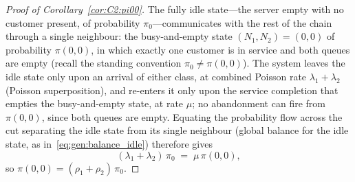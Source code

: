 \begin{proof}[Proof of Corollary~\ref{cor:C2:pi00}]
    The fully idle state---the server empty with no customer present, of probability $\pi_0$---communicates with the rest of the chain through a single neighbour: the busy-and-empty state $(N_1,N_2)=(0,0)$ of probability $\pi(0,0)$, in which exactly one customer is in service and both queues are empty (recall the standing convention $\pi_0\neq\pi(0,0)$). The system leaves the idle state only upon an arrival of either class, at combined Poisson rate $\lambda_1+\lambda_2$ (Poisson superposition), and re-enters it only upon the service completion that empties the busy-and-empty state, at rate $\mu$; no abandonment can fire from $\pi(0,0)$, since both queues are empty. Equating the probability flow across the cut separating the idle state from its single neighbour (global balance for the idle state, as in~\eqref{eq:gen:balance_idle}) therefore gives
    \begin{equation}
        (\lambda_1+\lambda_2)\,\pi_0 \;=\; \mu\,\pi(0,0),
        \label{eq:C2:balance_zero}
    \end{equation}
    so $\pi(0,0) = (\rho_1+\rho_2)\,\pi_0$.


\end{proof}
